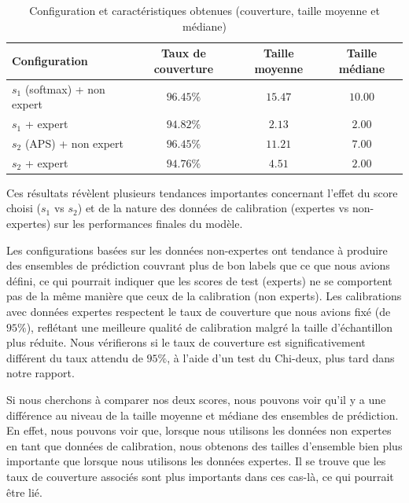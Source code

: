 \documentclass[a4paper,12pt]{article}
\begin{document}
\begin{table}[H]
\centering
\begin{tabular}{|l|c|c|c|}
    \hline
    \textbf{Configuration} & \textbf{Taux de couverture} & \textbf{Taille moyenne} & \textbf{Taille médiane} \\
    \hline
    $s_1$ (softmax) + non expert & $96.45\%$ & $15.47$ & $10.00$ \\
    $s_1$ + expert & $94.82\%$ & $2.13$ & $2.00$ \\
    $s_2$ (APS) + non expert & $96.45\%$ & $11.21$ & $7.00$ \\
    $s_2$ + expert & $94.76\%$ & $4.51$ & $2.00$ \\
    \hline
    \end{tabular}
\caption{Configuration et caractéristiques obtenues (couverture, taille moyenne et médiane)}
\label{tab3}
\end{table}
    
Ces résultats révèlent plusieurs tendances importantes concernant l'effet du score choisi ($s_1$ vs $s_2$) et de la nature des données de calibration (expertes vs non-expertes) sur les performances finales du modèle.

\vspace{0.2cm}

Les configurations basées sur les données non-expertes ont tendance à produire des ensembles de prédiction couvrant plus de bon labels que ce que nous avions défini, ce qui pourrait indiquer que les scores de test (experts) ne se comportent pas de la même manière que ceux de la calibration (non experts). Les calibrations avec données expertes respectent le taux de couverture que nous avions fixé (de $95\%$), reflétant une meilleure qualité de calibration malgré la taille d’échantillon plus réduite. Nous vérifierons si le taux de couverture est significativement différent du taux attendu de $95\%$, à l’aide d’un test du Chi-deux, plus tard dans notre rapport.

\vspace{0.2cm}

Si nous cherchons à comparer nos deux scores, nous pouvons voir qu'il y a une différence au niveau de la taille moyenne et médiane des ensembles de prédiction. En effet, nous pouvons voir que, lorsque nous utilisons les données non expertes en tant que données de calibration, nous obtenons des tailles d'ensemble bien plus importante que lorsque nous utilisons les données expertes. Il se trouve que les taux de couverture associés sont plus importants dans ces cas-là, ce qui pourrait être lié. 
\end{document}
